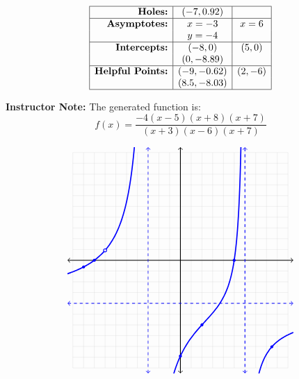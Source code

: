 \documentclass[addpoints]{exam}
\begin{document}
\begin{questions}
    \[\begin{array}{|r|c|c|} \hline \textbf{Holes:} & (-7, 0.92) & \\ \hline \textbf{Asymptotes:} & x = -3 & x = 6 \\ & y = -4 & \\ \hline \textbf{Intercepts:} & (-8, 0) & (5, 0) \\ & (0, -8.89) & \\ \hline \textbf{Helpful Points:} & (-9, -0.62) & (2, -6) \\ & (8.5, -8.03) & \\ \hline \end{array}\]
\begin{solution}
\textbf{Instructor Note:} The generated function is: \[f(x) = \frac{-4(x - 5)(x + 8)(x + 7)}{(x + 3)(x - 6)(x + 7)}\] 

 \[\begin{tikzpicture}[scale=0.39] \draw[step=1cm, gray!40, very thin] (-10,-10) grid (10,10); \draw[thick, <->] (-10.5,0) -- (10.5,0); \draw[thick, <->] (0,-10.5) -- (0,10.5); \clip (-10.5,-10.5) rectangle (10.5,10.5);\draw[dashed, blue, thick, <->] (-3, -10.5) -- (-3, 10.5); \draw[dashed, blue, thick, <->] (6, -10.5) -- (6, 10.5); \draw[dashed, blue, thick, <->] (-10.5, -4) -- (10.5, -4); \draw[blue, very thick, samples=80, domain=-10.5:-3.10000000000000, smooth] plot (\x, {-4 * (\x - (5)) * (\x - (-8)) / ((\x - (-3)) * (\x - (6)))}); \draw[blue, very thick, samples=80, domain=-2.90000000000000:5.90000000000000, smooth] plot (\x, {-4 * (\x - (5)) * (\x - (-8)) / ((\x - (-3)) * (\x - (6)))}); \draw[blue, very thick, samples=80, domain=6.10000000000000:10.5, smooth] plot (\x, {-4 * (\x - (5)) * (\x - (-8)) / ((\x - (-3)) * (\x - (6)))}); \fill[blue] (-8.0, 0) circle (4pt); \fill[blue] (5.0, 0) circle (4pt); \fill[blue] (0, -8.89) circle (4pt); \fill[blue] (-9.0, -0.62) circle (4pt); \fill[blue] (2.0, -6.0) circle (4pt); \fill[blue] (8.5, -8.03) circle (4pt); \draw[blue, thick, fill=white] (-7.0, 0.92) circle (4pt); \end{tikzpicture}\]
\end{solution}
\begin{center}
\end{center}
\newpage


\end{questions}
\end{document}
